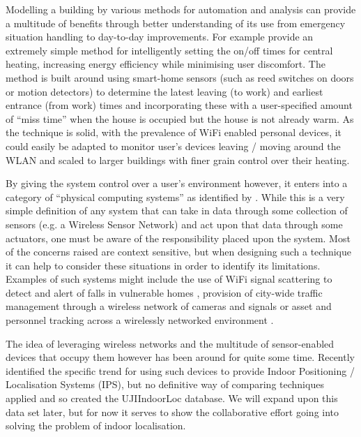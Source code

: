 \documentclass{UoYCSproject}
\begin{document}
            Modelling a building by various methods for automation and analysis can provide a multitude of benefits through better understanding of its use from emergency situation handling to day-to-day improvements. For example \citet{gao2009self} provide an extremely simple method for intelligently setting the on/off times for central heating, increasing energy efficiency while minimising user discomfort. The method is built around using smart-home sensors (such as reed switches on doors or motion detectors) to determine the latest leaving (to work) and earliest entrance (from work) times and incorporating these with a user-specified amount of ``miss time'' when the house is occupied but the house is not already warm. As the technique is solid, with the prevalence of WiFi enabled personal devices, it could easily be adapted to monitor user's devices leaving / moving around the WLAN and scaled to larger buildings with finer grain control over their heating.
            
            By giving the system control over a user's environment however, it enters into a category of ``physical computing systems'' as identified by \citet{stankovic2005opportunities}. While this is a very simple definition of any system that can take in data through some collection of sensors (e.g. a Wireless Sensor Network) and act upon that data through some actuators, one must be aware of the responsibility placed upon the system. Most of the concerns raised are context sensitive, but when designing such a technique it can help to consider these situations in order to identify its limitations. Examples of such systems might include the use of WiFi signal scattering to detect and alert of falls in vulnerable homes \citep{han2014wifall}, provision of city-wide traffic management through a wireless network of cameras and signals \citep{LATraffic} or asset and personnel tracking across a wirelessly networked environment \citep{Ekahau}.
		
            The idea of leveraging wireless networks and the multitude of sensor-enabled devices that occupy them however has been around for quite some time. Recently \citet{torres2014ujiindoorloc} identified the specific trend for using such devices to provide Indoor Positioning / Localisation Systems (IPS), but no definitive way of comparing techniques applied and so created the UJIIndoorLoc database. We will expand upon this data set later, but for now it serves to show the collaborative effort going into solving the problem of indoor localisation.
                
\end{document}
